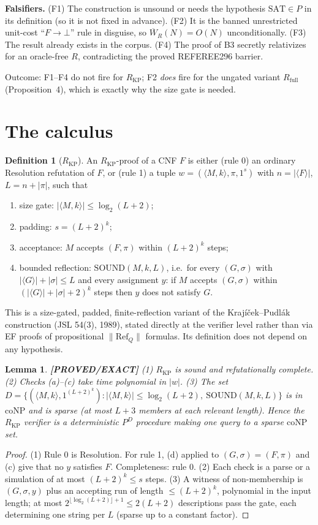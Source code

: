 \documentclass[11pt]{article}
\newtheorem{lemma}[theorem]{Lemma}
\theoremstyle{definition}
\newtheorem{definition}[theorem]{Definition}
\theoremstyle{remark}
\newcommand{\SAT}{\mathrm{SAT}}
\newcommand{\coNP}{\mathrm{coNP}}
\newcommand{\Wb}{\overline W}
\newcommand{\RKP}{R_{\mathrm{KP}}}
\newcommand{\status}[1]{\textbf{[#1]}}
\begin{document}
\textbf{Falsifiers.} (F1) The construction is unsound or needs the hypothesis $\SAT\in P$ in its definition
(so it is not fixed in advance). (F2) It is the banned unrestricted unit-cost ``$F\to\bot$'' rule in disguise,
so $\Wb_R(N)=O(N)$ unconditionally. (F3) The result already exists in the corpus. (F4) The proof of B3
secretly relativizes for an oracle-free $R$, contradicting the proved REFEREE296 barrier.

Outcome: F1--F4 do not fire for $\RKP$; F2 \emph{does} fire for the ungated variant $R_{\mathrm{full}}$
(Proposition~4), which is exactly why the size gate is needed.

\section{The calculus}
\begin{definition}[$\RKP$]
An $\RKP$-proof of a CNF $F$ is either (rule 0) an ordinary Resolution refutation of $F$, or (rule 1) a
tuple $w=(\langle M,k\rangle,\pi,1^{s})$ with $n=|\langle F\rangle|$, $L=n+|\pi|$, such that
\begin{enumerate}
\item[(a)] size gate: $|\langle M,k\rangle|\le\log_2(L+2)$;
\item[(b)] padding: $s=(L+2)^k$;
\item[(c)] acceptance: $M$ accepts $(F,\pi)$ within $(L+2)^k$ steps;
\item[(d)] bounded reflection: $\mathrm{SOUND}(M,k,L)$, i.e.\ for every $(G,\sigma)$ with
$|\langle G\rangle|+|\sigma|\le L$ and every assignment $y$: if $M$ accepts $(G,\sigma)$ within
$(|\langle G\rangle|+|\sigma|+2)^k$ steps then $y$ does not satisfy $G$.
\end{enumerate}
\end{definition}
This is a size-gated, padded, finite-reflection variant of the Krajíček--Pudlák construction (JSL 54(3),
1989), stated directly at the verifier level rather than via EF proofs of propositional
$\|\mathrm{Ref}_Q\|$ formulas. Its definition does not depend on any hypothesis.

\begin{lemma}\label{lem:basic}
\status{PROVED/EXACT}
(1) $\RKP$ is sound and refutationally complete. (2) Checks (a)--(c) take time polynomial in $|w|$.
(3) The set $D=\{(\langle M,k\rangle,1^{(L+2)^k}): |\langle M,k\rangle|\le\log_2(L+2),\ \mathrm{SOUND}(M,k,L)\}$
is in $\coNP$ and is sparse (at most $L+3$ members at each relevant length). Hence the $\RKP$ verifier is a
deterministic $P^{D}$ procedure making one query to a sparse $\coNP$ set.
\end{lemma}
\begin{proof}
(1) Rule 0 is Resolution. For rule 1, (d) applied to $(G,\sigma)=(F,\pi)$ and (c) give that no $y$
satisfies $F$. Completeness: rule 0. (2) Each check is a parse or a simulation of at most $(L+2)^k\le s$
steps. (3) A witness of non-membership is $(G,\sigma,y)$ plus an accepting run of length
$\le(L+2)^k$, polynomial in the input length; at most $2^{\lfloor\log_2(L+2)\rfloor+1}\le 2(L+2)$
descriptions pass the gate, each determining one string per $L$ (sparse up to a constant factor).
\end{proof}
\end{document}

